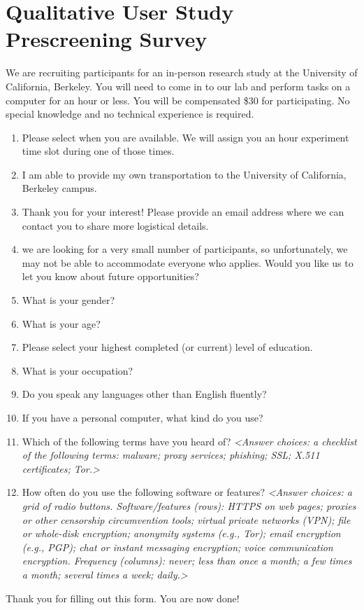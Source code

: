 \documentclass[USenglish,oneside,twocolumn]{article}
\begin{document}
\section{Qualitative User Study Prescreening Survey} 
\label{qualitative-prescreening}
We are recruiting participants for an in-person research study at the University of California, Berkeley. 
You will need to come in to our lab and perform tasks on a computer for an hour or less. You will be compensated \$30 for participating. No special knowledge and no technical experience is required.\\

\begin{enumerate}
\item{Please select when you are available. We will assign you an hour experiment time slot during one of those times.}
\item{I am able to provide my own transportation to the University of California, Berkeley 
campus.}
\item{Thank you for your interest! Please provide an email address where we can contact you to share more logistical details.}
\item{we are looking for a very small number of participants, so unfortunately, we may not be able to accommodate everyone who applies. Would you like us to let you know about future opportunities?}
\item{What is your gender?}
\item{What is your age?}
\item{Please select your highest completed (or current) level of education.}
\item{What is your occupation?} 
\item{Do you speak any languages other than English fluently?}
\item{If you have a personal computer, what kind do you use?}
\item{Which of the following terms have you heard of? \textit{<Answer choices: a checklist of the following terms: malware; proxy services; phishing; SSL; X.511 certificates; Tor.>}}
\item{How often do you use the following software or features? \textit{<Answer choices: a grid of radio buttons. Software/features (rows): HTTPS on web pages; proxies or other censorship circumvention tools; virtual private networks (VPN); file or whole-disk encryption; anonymity systems (e.g., Tor); email encryption (e.g., PGP); chat or instant messaging encryption; voice communication encryption. Frequency (columns): never; less than once a month; a few times a month; several times a week; daily.>}}
\end{enumerate}
Thank you for filling out this form. You are now done!
\end{document}
